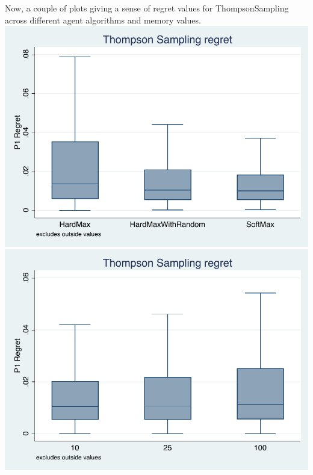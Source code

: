 \documentclass[11pt,letterpaper]{article}
\begin{document}
\pagebreak
Now, a couple of plots giving a sense of regret values for ThompsonSampling across different agent algorithms and memory values.\\
\includegraphics[scale=1]{ts_regret_agent_algs} \\
\includegraphics[scale=1]{ts_regret_memory}
\end{document}
